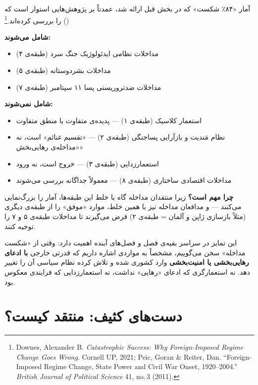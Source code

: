 \begin{tcolorbox}[legalbox, title={آمار این فصل دقیقاً شامل چه می‌شود؟}]
آمار «۸۴٪ شکست» که در بخش قبل ارائه شد، عمدتاً بر پژوهش‌هایی استوار
است که 
() را بررسی
کرده‌اند.\footnote{%
  Downes, Alexander B. \textit{Catastrophic Success: Why
  Foreign-Imposed Regime Change Goes Wrong}. Cornell UP, 2021;
  Peic, Goran \& Reiter, Dan. ``Foreign-Imposed Regime Change,
  State Power and Civil War Onset, 1920–2004.''
  \textit{British Journal of Political Science} 41, no.\,3 (2011).}

\textbf{شامل می‌شوند:}
\begin{itemize}
\item مداخلات نظامی ایدئولوژیک جنگ سرد (طبقه‌ی ۴)
\item مداخلات بشردوستانه (طبقه‌ی ۵)
\item مداخلات ضدتروریستی پسا ۱۱ سپتامبر (طبقه‌ی ۷)
\end{itemize}

\textbf{شامل نمی‌شوند:}
\begin{itemize}
\item استعمار کلاسیک (طبقه‌ی ۱) — پدیده‌ی متفاوت با منطق متفاوت
\item نظام مَندیت و بازآرایی پساجنگی (طبقه‌ی ۲) — «تقسیم غنائم» است،
  نه «مداخله‌ی رهایی‌بخش»
\item استعمارزدایی (طبقه‌ی ۳) — خروج است، نه ورود
\item مداخلات اقتصادی ساختاری (طبقه‌ی ۸) — معمولاً جداگانه بررسی
  می‌شوند
\end{itemize}

\textbf{چرا مهم است؟} زیرا منتقدان مداخله گاه با خلط این طبقه‌ها،
آمار را بزرگ‌نمایی می‌کنند — و مدافعان مداخله نیز با همین خلط، موارد
«موفق» را از طبقه‌ی دیگری (مثلاً بازسازی ژاپن و آلمان = طبقه‌ی ۲)
قرض می‌گیرند تا مداخلات طبقه‌ی ۵ و ۷ را توجیه کنند.
\end{tcolorbox}

این تمایز در سراسر بقیه‌ی فصل و فصل‌های آینده اهمیت دارد: وقتی از
«شکست مداخله» سخن می‌گوییم، مشخصاً به مواردی اشاره داریم که قدرتی
خارجی \textbf{با ادعای رهایی‌بخشی یا امنیت‌بخشی} وارد کشوری شده و
تلاش کرده نظام سیاسی آن را تغییر دهد. نه استعمارگری که ادعای «رهایی»
نداشت، نه استعمارزدایی که فرایندی معکوس بود.

\section{دست‌های کثیف: منتقد کیست؟}
\label{sec:ch15-dirty-hands}

